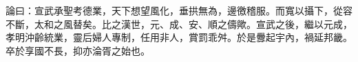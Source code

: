\begin{pinyinscope}
 論曰：宣武承聖考德業，天下想望風化，垂拱無為，邊徼稽服。而寬以攝下，從容不斷，太和之風替矣。比之漢世，元、成、安、順之儔歟。宣武之後，繼以元成，孝明沖齡統業，靈后婦人專制，任用非人，賞罰乖舛。於是釁起宇內，禍延邦畿。卒於享國不長，抑亦淪胥之始也。



\end{pinyinscope}